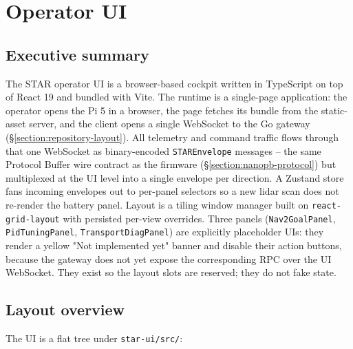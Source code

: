 
\section{Operator UI}
\label{section:ui-architecture}

\subsection{Executive summary}

The STAR operator UI is a browser-based cockpit written in TypeScript on
top of React 19 and bundled with Vite. The runtime is a single-page
application: the operator opens the Pi 5 in a browser, the page
fetches its bundle from the static-asset server, and the client opens a
single WebSocket to the Go gateway (\S\ref{section:repository-layout}).
All telemetry and command traffic flows through that one WebSocket as
binary-encoded \texttt{STAREnvelope} messages -- the same Protocol
Buffer wire contract as the firmware (\S\ref{section:nanopb-protocol})
but multiplexed at the UI level into a single envelope per direction.
A Zustand store fans incoming envelopes out to per-panel selectors so a
new lidar scan does not re-render the battery panel. Layout is a tiling
window manager built on \texttt{react-grid-layout} with persisted
per-view overrides. Three panels (\texttt{Nav2GoalPanel},
\texttt{PidTuningPanel}, \texttt{TransportDiagPanel}) are explicitly
placeholder UIs: they render a yellow "Not implemented yet" banner and
disable their action buttons, because the gateway does not yet expose
the corresponding RPC over the UI WebSocket. They exist so the layout
slots are reserved; they do not fake state.

\subsection{Layout overview}

The UI is a flat tree under \texttt{star-ui/src/}:

